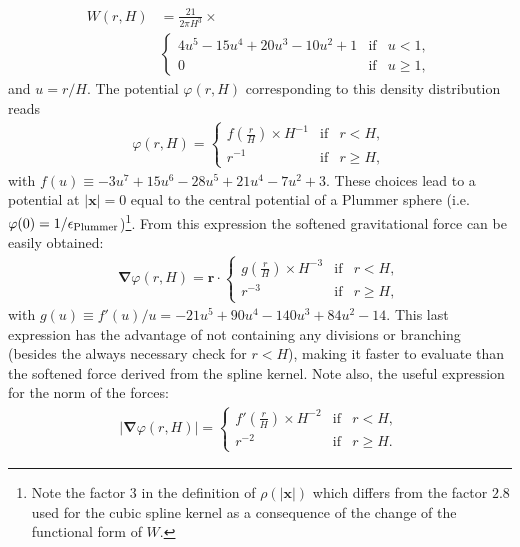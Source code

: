 \begin{align}
W(r,H) &= \frac{21}{2\pi H^3} \times \nonumber \\
&\left\lbrace\begin{array}{rcl}
4u^5 - 15u^4 + 20u^3 - 10u^2 + 1 & \mbox{if} & u < 1,\\
0 & \mbox{if} & u \geq 1,
\end{array}
\right.
\end{align}
and $u = r/H$. The potential $\varphi(r,H)$ corresponding to this density distribution reads
\begin{align}
\varphi(r,H) = 
\left\lbrace\begin{array}{rcl}
f(\frac{r}{H}) \times H^{-1} & \mbox{if} & r < H,\\
r^{-1} & \mbox{if} & r \geq H,
\end{array}
\right.
\label{eq:fmm:potential}
\end{align}
with $f(u) \equiv -3u^7 + 15u^6 - 28u^5 + 21u^4 - 7u^2 + 3$. These
choices lead to a potential at $|\mathbf{x}| = 0$ equal to the central
potential of a Plummer sphere (i.e. $\varphi(0) = 1/\epsilon_{\rm
  Plummer}$)\footnote{Note the factor $3$ in the definition of
  $\rho(|\mathbf{x}|)$ which differs from the factor $2.8$ used for
  the cubic spline kernel as a consequence of the change of the functional
  form of $W$.}. From this expression the softened gravitational force can
be easily obtained:
\begin{align}
\mathbf{\nabla}\varphi(r,H) = \mathbf{r} \cdot
\left\lbrace\begin{array}{rcl}
g(\frac{r}{H}) \times H^{-3} & \mbox{if} & r < H,\\
r^{-3} & \mbox{if} & r \geq H,
\end{array}
\right.
\label{eq:fmm:force}
\end{align}
with $g(u) \equiv f'(u)/u = -21u^5+90u^4-140u^3+84u^2-14$. This last
expression has the advantage of not containing any divisions or
branching (besides the always necessary check for $r<H$), making it
faster to evaluate than the softened force derived from the
\cite{Monaghan1985} spline kernel. Note also, the useful expression
for the norm of the forces:
\begin{align}
|\mathbf{\nabla}\varphi(r,H)| = 
\left\lbrace\begin{array}{rcl}
f'(\frac{r}{H}) \times H^{-2} & \mbox{if} & r < H,\\
r^{-2} & \mbox{if} & r \geq H.
\end{array}
\right.
\label{eq:fmm:force}
\end{align}
